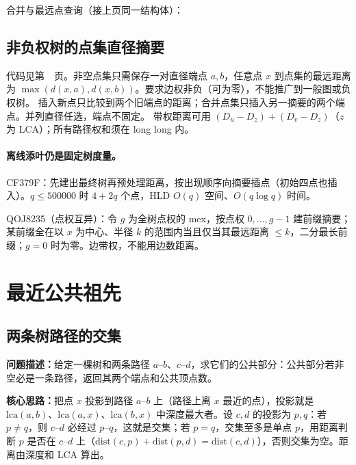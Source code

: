 \Needspace{413pt}



\newpage

\noindent 合并与最远点查询（接上页同一结构体）：



\subsection{非负权树的点集直径摘要}\label{knowledge-set-diameter}
代码见第~\pageref{compact-TreeDiameter}~页。非空点集只需保存一对直径端点 $a,b$，任意点 $x$ 到点集的最远距离为
$\max(d(x,a),d(x,b))$。要求边权非负（可为零），不能推广到一般图或负权树。
插入新点只比较到两个旧端点的距离；合并点集只插入另一摘要的两个端点。并列直径任选，端点不固定。
带权距离可用 $(D_u-D_z)+(D_v-D_z)$（$z$ 为 LCA）；所有路径权和须在 long long 内。

\paragraph{离线添叶仍是固定树度量。}
CF379F：先建出最终树再预处理距离，按出现顺序向摘要插点（初始四点也插入）。$q\le500000$ 时 $4+2q$ 个点，HLD $O(q)$ 空间、$O(q\log q)$ 时间。

QOJ8235（点权互异）：令 $g$ 为全树点权的 mex，按点权 $0,\ldots,g-1$ 建前缀摘要；
某前缀全在以 $x$ 为中心、半径 $k$ 的范围内当且仅当其最远距离 $\le k$，二分最长前缀；$g=0$ 时为零。边带权，不能用边数距离。

\clearpage


\Needspace{572pt}

\section{最近公共祖先}

\subsection{两条树路径的交集}\label{compact-path_intersection}

\noindent\textbf{问题描述：}\allowbreak 给定一棵树和两条路径 $a$--$b$、$c$--$d$，求它们的公共部分：公共部分若非空必是一条路径，返回其两个端点和公共顶点数。

\textbf{核心思路：}\allowbreak 把点 $x$ 投影到路径 $a$--$b$ 上（路径上离 $x$ 最近的点），投影就是 $\mathrm{lca}(a,b)$、$\mathrm{lca}(a,x)$、$\mathrm{lca}(b,x)$ 中深度最大者。设 $c,d$ 的投影为 $p,q$：若 $p\ne q$，则 $c$--$d$ 必经过 $p$--$q$，这就是交集；若 $p=q$，交集至多是单点 $p$，用距离判断 $p$ 是否在 $c$--$d$ 上（$\mathrm{dist}(c,p)+\mathrm{dist}(p,d)=\mathrm{dist}(c,d)$），否则交集为空。距离由深度和 LCA 算出。




